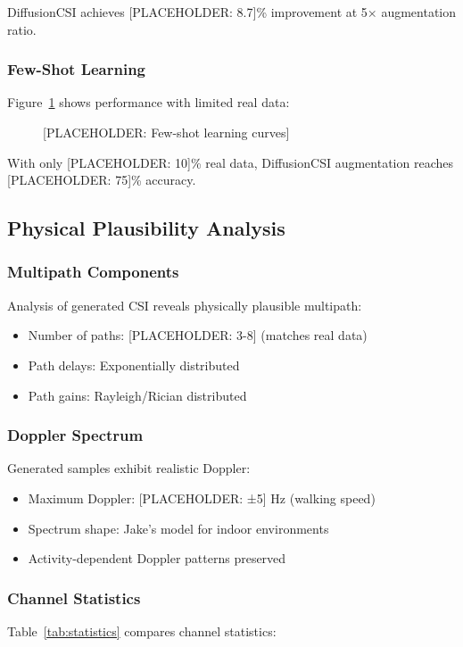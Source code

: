 \documentclass[journal]{IEEEtran}
\begin{document}
DiffusionCSI achieves [PLACEHOLDER: 8.7]\% improvement at 5× augmentation ratio.

\subsubsection{Few-Shot Learning}
Figure~\ref{fig:fewshot} shows performance with limited real data:

\begin{figure}[h]
\centering
\caption{[PLACEHOLDER: Few-shot learning curves]}
\label{fig:fewshot}
\end{figure}

With only [PLACEHOLDER: 10]\% real data, DiffusionCSI augmentation reaches [PLACEHOLDER: 75]\% accuracy.

\subsection{Physical Plausibility Analysis}

\subsubsection{Multipath Components}
Analysis of generated CSI reveals physically plausible multipath:
\begin{itemize}
\item Number of paths: [PLACEHOLDER: 3-8] (matches real data)
\item Path delays: Exponentially distributed
\item Path gains: Rayleigh/Rician distributed
\end{itemize}

\subsubsection{Doppler Spectrum}
Generated samples exhibit realistic Doppler:
\begin{itemize}
\item Maximum Doppler: [PLACEHOLDER: ±5] Hz (walking speed)
\item Spectrum shape: Jake's model for indoor environments
\item Activity-dependent Doppler patterns preserved
\end{itemize}

\subsubsection{Channel Statistics}
Table~\ref{tab:statistics} compares channel statistics:
\end{document}
